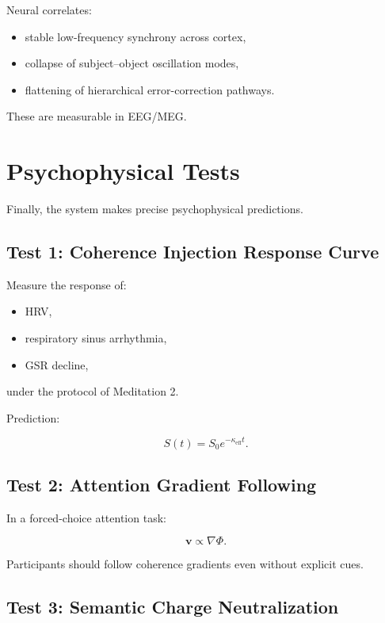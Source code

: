 \documentclass[12pt]{article}
\begin{document}
Neural correlates:

\begin{itemize}
\item stable low-frequency synchrony across cortex,
\item collapse of subject--object oscillation modes,
\item flattening of hierarchical error-correction pathways.
\end{itemize}

These are measurable in EEG/MEG.


\newpage


\chapter{Psychophysical Tests}

Finally, the system makes precise psychophysical predictions.

\section{Test 1: Coherence Injection Response Curve}

Measure the response of:

\begin{itemize}
    \item HRV,
    \item respiratory sinus arrhythmia,
    \item GSR decline,
\end{itemize}

under the protocol of Meditation 2.

Prediction:

\[
S(t) = S_0 e^{-\kappa_{\mathrm{eff}} t}.
\]

\section{Test 2: Attention Gradient Following}

In a forced-choice attention task:

\[
\mathbf{v} \propto \nabla \Phi.
\]

Participants should follow coherence gradients even without explicit cues.

\section{Test 3: Semantic Charge Neutralization}
\end{document}
